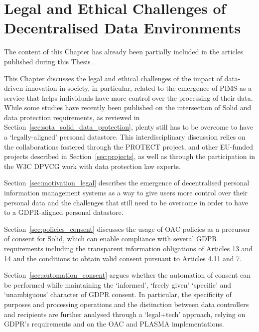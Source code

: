 \chapter{Legal and Ethical Challenges of Decentralised Data Environments}
\label{chap:legal}

\begin{tcolorbox}[colback=royallavender!40]
The content of this Chapter has already been partially included in the articles published during this Thesis \citep{esteves_fostering_2022,asgarinia_who_2023,florea_is_2023}.
\end{tcolorbox}

This Chapter discusses the legal and ethical challenges of the impact of data-driven innovation in society, in particular, related to the emergence of PIMS as a service that helps individuals have more control over the processing of their data.
While some studies have recently been published on the intersection of Solid and data protection requirements, as reviewed in Section~\ref{sec:sota_solid_data_protection}, plenty still has to be overcome to have a `legally-aligned' personal datastore.
This interdisciplinary discussion relies on the collaborations fostered through the PROTECT project, and other EU-funded projects described in Section~\ref{sec:projects}, as well as through the participation in the W3C DPVCG work with data protection law experts.

Section~\ref{sec:motivation_legal} describes the emergence of decentralised personal information management systems as a way to give users more control over their personal data and the challenges that still need to be overcome in order to have to a GDPR-aligned personal datastore.

Section~\ref{sec:policies_consent} discusses the usage of OAC policies as a precursor of consent for Solid, which can enable compliance with several GDPR requirements including the transparent information obligations of Articles 13 and 14 and the conditions to obtain valid consent pursuant to Articles 4.11 and 7.

Section~\ref{sec:automation_consent} argues whether the automation of consent can be performed while maintaining the `informed', `freely given' `specific' and `unambiguous' character of GDPR consent.
In particular, the specificity of purposes and processing operations and the distinction between data controllers and recipients are further analysed through a `legal+tech' approach, relying on GDPR's requirements and on the OAC and PLASMA implementations. 




% 
% 